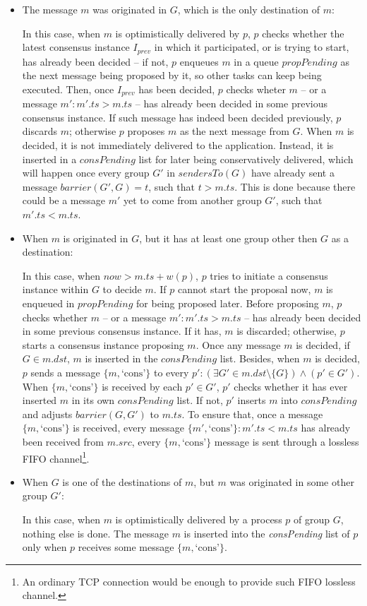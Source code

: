\documentclass[times, 10pt]{article}
\begin{document}
\begin{itemize}
  \item The message $m$ was originated in $G$, which is the only destination of $m$:
  
  In this case, when $m$ is optimistically delivered by $p$, $p$ checks whether the latest consensus instance $I_{prev}$ in which it participated, or is trying to start, has already been decided -- if not, $p$ enqueues $m$ in a queue $propPending$ as the next message being proposed by it, so other tasks can keep being executed. Then, once $I_{prev}$ has been decided, $p$ checks wheter $m$ -- or a message $m' : m'.ts > m.ts$ -- has already been decided in some previous consensus instance. If such message has indeed been decided previously, $p$ discards $m$; otherwise $p$ proposes $m$ as the next message from $G$. When $m$ is decided, it is not immediately delivered to the application. Instead, it is inserted in a $consPending$ list for later being conservatively delivered, which will happen once every group $G'$ in $sendersTo(G)$ have already sent a message $barrier(G',G) = t$, such that $t > m.ts$. This is done because there could be a message $m'$ yet to come from another group $G'$, such that $m'.ts < m.ts$.

  \item When $m$ is originated in $G$, but it has at least one group other then $G$ as a destination:
  
  In this case, when $now > m.ts + w(p)$, $p$ tries to initiate a consensus instance within $G$ to decide $m$. If $p$ cannot start the proposal now, $m$ is enqueued in $propPending$ for being proposed later. Before proposing $m$, $p$ checks whether $m$ -- or a message $m' : m'.ts > m.ts$ -- has already been decided in some previous consensus instance. If it has, $m$ is discarded; otherwise, $p$ starts a consensus instance proposing $m$. Once any message $m$ is decided, if $G \in m.dst$, $m$ is inserted in the $consPending$ list. Besides, when $m$ is decided, $p$ sends a message $\{m, \text{`cons'}\}$ to every \mbox{$p' : (\exists G' \in m.dst \setminus \{G\}) \wedge (p' \in G')$}. When $\{m, \text{`cons'}\}$ is received by each $p' \in G'$, $p'$ checks whether it has ever inserted $m$ in its own $consPending$ list. If not, $p'$ inserts $m$ into $consPending$ and adjusts $barrier(G, G')$ to $m.ts$. To ensure that, once a message $\{m, \text{`cons'}\}$ is received, every message \mbox{$\{m', \text{`cons'}\}:m'.ts<m.ts$} has already been received from $m.src$, every $\{m, \text{`cons'}\}$ message is sent through a lossless FIFO channel\footnote{An ordinary TCP connection would be enough to provide such FIFO lossless channel.}.
  
  \item When $G$ is one of the destinations of $m$, but $m$ was originated in some other group $G'$:
  
  In this case, when $m$ is optimistically delivered by a process $p$ of group $G$, nothing else is done. The message $m$ is inserted into the \mbox{\textit{consPending}} list of $p$ only when $p$ receives some message $\{m, \text{`cons'}\}$.
\end{itemize}
\end{document}
